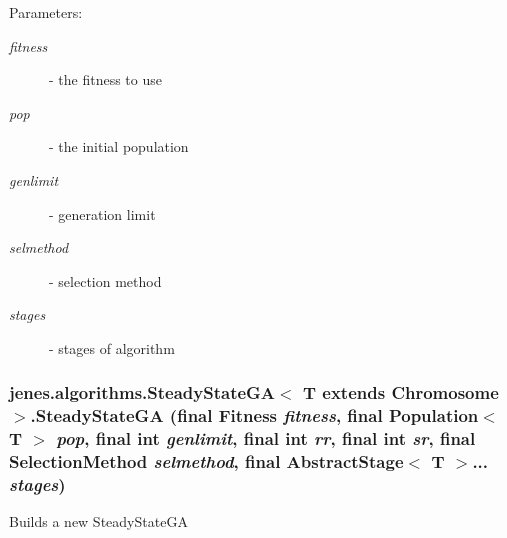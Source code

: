 \begin{Desc}
\item[Parameters:]
\begin{description}
\item[{\em fitness}]- the fitness to use \item[{\em pop}]- the initial population \item[{\em genlimit}]- generation limit \item[{\em selmethod}]- selection method \item[{\em stages}]- stages of algorithm \end{description}
\end{Desc}
\hypertarget{classjenes_1_1algorithms_1_1_steady_state_g_a_3_01_t_01extends_01_chromosome_01_4_7f95aed43d04c3290cc5fd98a569b6e0}{
\subsubsection[SteadyStateGA]{\setlength{\rightskip}{0pt plus 5cm}jenes.algorithms.SteadyStateGA$<$ T extends Chromosome $>$.SteadyStateGA (final Fitness {\em fitness}, \/  final Population$<$ T $>$ {\em pop}, \/  final int {\em genlimit}, \/  final int {\em rr}, \/  final int {\em sr}, \/  final {\bf SelectionMethod} {\em selmethod}, \/  final AbstractStage$<$ T $>$... {\em stages})}}
\label{classjenes_1_1algorithms_1_1_steady_state_g_a_3_01_t_01extends_01_chromosome_01_4_7f95aed43d04c3290cc5fd98a569b6e0}


Builds a new SteadyStateGA

